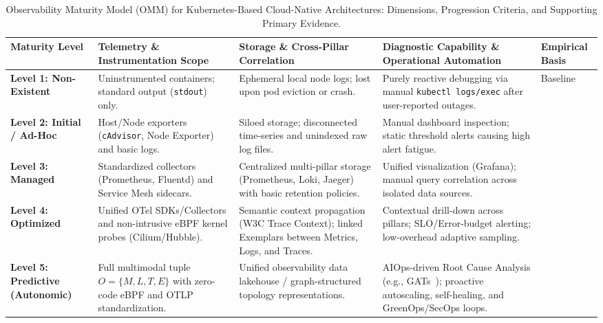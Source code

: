 \begin{table}[!t]
\centering
\caption{Observability Maturity Model (OMM) for Kubernetes-Based Cloud-Native Architectures: Dimensions, Progression Criteria, and Supporting Primary Evidence.}
\label{tab:omm_architecture}
\footnotesize
\renewcommand{\arraystretch}{1.15}
\begin{tabularx}{\textwidth}{@{}l p{2.8cm} X X l@{}}
\toprule
\textbf{Maturity Level} & \textbf{Telemetry \& Instrumentation Scope} & \textbf{Storage \& Cross-Pillar Correlation} & \textbf{Diagnostic Capability \& Operational Automation} & \textbf{Empirical Basis} \\
\midrule
\textbf{Level 1: Non-Existent} & Uninstrumented containers; standard output (\texttt{stdout}) only. & Ephemeral local node logs; lost upon pod eviction or crash. & Purely reactive debugging via manual \texttt{kubectl logs/exec} after user-reported outages. & Baseline~\cite{kosinska_2023, usman_2022} \\
\textbf{Level 2: Initial / Ad-Hoc} & Host/Node exporters (\texttt{cAdvisor}, Node Exporter) and basic logs. & Siloed storage; disconnected time-series and unindexed raw log files. & Manual dashboard inspection; static threshold alerts causing high alert fatigue. &~\cite{zanatta_23, faseeha_2025, usman_2022} \\
\textbf{Level 3: Managed} & Standardized collectors (Prometheus, Fluentd) and Service Mesh sidecars. & Centralized multi-pillar storage (Prometheus, Loki, Jaeger) with basic retention policies. & Unified visualization (Grafana); manual query correlation across isolated data sources. &~\cite{araujo_24, hartikainen_2024, kosinska_2023, wei_2025} \\
\textbf{Level 4: Optimized} & Unified OTel SDKs/Collectors and non-intrusive eBPF kernel probes (Cilium/Hubble). & Semantic context propagation (W3C Trace Context); linked Exemplars between Metrics, Logs, and Traces. & Contextual drill-down across pillars; SLO/Error-budget alerting; low-overhead adaptive sampling. &~\cite{faseeha_2025, gomes_2025, hartikainen_2024, kosinska_2023} \\
\textbf{Level 5: Predictive (Autonomic)} & Full multimodal tuple $O = \{M, L, T, E\}$ with zero-code eBPF and OTLP standardization. & Unified observability data lakehouse / graph-structured topology representations. & AIOps-driven Root Cause Analysis (e.g., GATs~\cite{han_2024}); proactive autoscaling, self-healing, and GreenOps/SecOps loops. &~\cite{deng_2024, gomes_2025, han_2024, kosinska_2023} \\
\bottomrule
\end{tabularx}
\end{table}